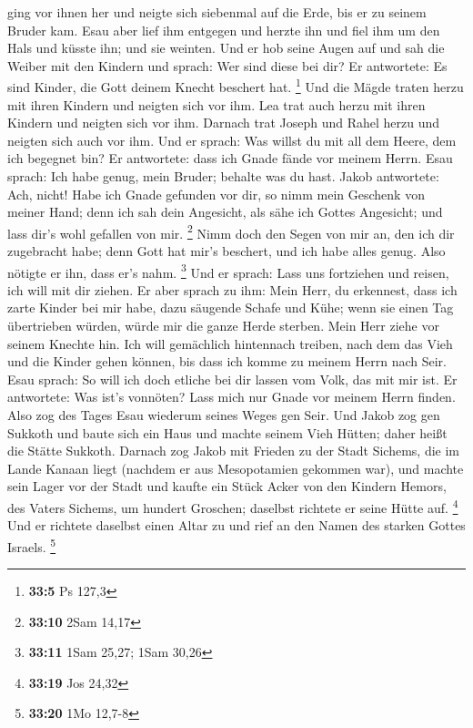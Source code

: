 ging vor ihnen her und neigte sich siebenmal auf die Erde, bis er zu
seinem Bruder kam.  Esau aber lief ihm entgegen und herzte
ihn und fiel ihm um den Hals und küsste ihn; und sie weinten.
 Und er hob seine Augen auf und sah die Weiber mit den
Kindern und sprach: Wer sind diese bei dir? Er antwortete: Es sind
Kinder, die Gott deinem Knecht beschert hat. \footnote{\textbf{33:5} Ps
  127,3}  Und die Mägde traten herzu mit ihren Kindern und
neigten sich vor ihm.  Lea trat auch herzu mit ihren Kindern
und neigten sich vor ihm. Darnach trat Joseph und Rahel herzu und
neigten sich auch vor ihm.  Und er sprach: Was willst du mit
all dem Heere, dem ich begegnet bin? Er antwortete: dass ich Gnade fände
vor meinem Herrn.  Esau sprach: Ich habe genug, mein Bruder;
behalte was du hast.  Jakob antwortete: Ach, nicht! Habe
ich Gnade gefunden vor dir, so nimm mein Geschenk von meiner Hand; denn
ich sah dein Angesicht, als sähe ich Gottes Angesicht; und lass dir's
wohl gefallen von mir. \footnote{\textbf{33:10} 2Sam 14,17}
 Nimm doch den Segen von mir an, den ich dir zugebracht
habe; denn Gott hat mir's beschert, und ich habe alles genug. Also
nötigte er ihn, dass er's nahm. \footnote{\textbf{33:11} 1Sam 25,27;
  1Sam 30,26}  Und er sprach: Lass uns fortziehen und
reisen, ich will mit dir ziehen.  Er aber sprach zu ihm:
Mein Herr, du erkennest, dass ich zarte Kinder bei mir habe, dazu
säugende Schafe und Kühe; wenn sie einen Tag übertrieben würden, würde
mir die ganze Herde sterben.  Mein Herr ziehe vor seinem
Knechte hin. Ich will gemächlich hintennach treiben, nach dem das Vieh
und die Kinder gehen können, bis dass ich komme zu meinem Herrn nach
Seir.  Esau sprach: So will ich doch etliche bei dir lassen
vom Volk, das mit mir ist. Er antwortete: Was ist's vonnöten? Lass mich
nur Gnade vor meinem Herrn finden.  Also zog des Tages Esau
wiederum seines Weges gen Seir.  Und Jakob zog gen Sukkoth
und baute sich ein Haus und machte seinem Vieh Hütten; daher heißt die
Stätte Sukkoth.  Darnach zog Jakob mit Frieden zu der Stadt
Sichems, die im Lande Kanaan liegt (nachdem er aus Mesopotamien gekommen
war), und machte sein Lager vor der Stadt  und kaufte ein
Stück Acker von den Kindern Hemors, des Vaters Sichems, um hundert
Groschen; daselbst richtete er seine Hütte auf. \footnote{\textbf{33:19}
  Jos 24,32}  Und er richtete daselbst einen Altar zu und
rief an den Namen des starken Gottes Israels. \footnote{\textbf{33:20}
  1Mo 12,7-8}

